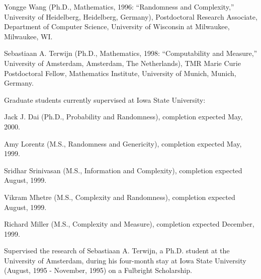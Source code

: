 \hangindent=0.3in
\vspace*{\medskipamount}
Yongge Wang (Ph.D., Mathematics, 1996: ``Randomness and 
Complexity,'' University of Heidelberg, Heidelberg,
Germany), Postdoctoral Research Associate, Department
of Computer Science, University of Wisconsin at Milwaukee,
Milwaukee, WI.

\hangindent=0.3in
\vspace*{\medskipamount}
Sebastiaan A. Terwijn (Ph.D., Mathematics, 1998: 
``Computability and Measure,'' University of Amsterdam,
Amsterdam, The Netherlands), TMR Marie Curie Postdoctoral
Fellow, Mathematics Institute, University of Munich, Munich,
Germany.

\vspace*{\medskipamount}
Graduate students currently supervised at Iowa State
University:

\vspace*{\smallskipamount}

\hangindent=0.6in
\hspace*{0.3in} Jack J. Dai (Ph.D., Probability and Randomness),
completion expected May, 2000.

\vspace*{\smallskipamount}

\hangindent=0.6in
\hspace*{0.3in} Amy Lorentz (M.S., Randomness and Genericity),
completion expected May, 1999.

\vspace*{\smallskipamount}

\hangindent=0.6in
\hspace*{0.3in} Sridhar Srinivasan (M.S., Information and
Complexity), completion expected August, 1999.

\hangindent=0.6in
\hspace*{0.3in} Vikram Mhetre (M.S., Complexity and
Randomness), completion expected August, 1999.

\hangindent=0.6in
\hspace*{0.3in} Richard Miller (M.S., Complexity and 
Measure), completion expected December, 1999.


\vspace*{0.2in}
\hangindent=0.3in
Supervised the research of Sebastiaan A. Terwijn, a
Ph.D. student at the University of Amsterdam, during his
four-month stay at Iowa State University (August, 1995 -
November, 1995) on a Fulbright Scholarship.

